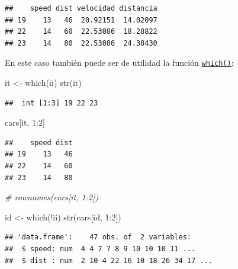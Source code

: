 \documentclass[
]{book}
\newenvironment{Shaded}{\begin{snugshade}}{\end{snugshade}}
\newcommand{\CommentTok}[1]{\textcolor[rgb]{0.56,0.35,0.01}{\textit{#1}}}
\newcommand{\DecValTok}[1]{\textcolor[rgb]{0.00,0.00,0.81}{#1}}
\newcommand{\FunctionTok}[1]{\textcolor[rgb]{0.00,0.00,0.00}{#1}}
\newcommand{\NormalTok}[1]{#1}
\newcommand{\OtherTok}[1]{\textcolor[rgb]{0.56,0.35,0.01}{#1}}
\newcommand{\SpecialCharTok}[1]{\textcolor[rgb]{0.00,0.00,0.00}{#1}}
\theoremstyle{break}
\theoremstyle{nonumberplain}
\begin{document}
\begin{verbatim}
##    speed dist velocidad distancia
## 19    13   46  20.92151  14.02097
## 22    14   60  22.53086  18.28822
## 23    14   80  22.53086  24.38430
\end{verbatim}

En este caso también puede ser de utilidad la función \href{https://www.rdocumentation.org/packages/base/versions/3.6.1/topics/which}{\texttt{which()}}:

\begin{Shaded}
\begin{Highlighting}[]
\NormalTok{it }\OtherTok{\textless{}{-}} \FunctionTok{which}\NormalTok{(ii)}
\FunctionTok{str}\NormalTok{(it)}
\end{Highlighting}
\end{Shaded}

\begin{verbatim}
##  int [1:3] 19 22 23
\end{verbatim}

\begin{Shaded}
\begin{Highlighting}[]
\NormalTok{cars[it, }\DecValTok{1}\SpecialCharTok{:}\DecValTok{2}\NormalTok{]}
\end{Highlighting}
\end{Shaded}

\begin{verbatim}
##    speed dist
## 19    13   46
## 22    14   60
## 23    14   80
\end{verbatim}

\begin{Shaded}
\begin{Highlighting}[]
\CommentTok{\# rownames(cars[it, 1:2])}

\NormalTok{id }\OtherTok{\textless{}{-}} \FunctionTok{which}\NormalTok{(}\SpecialCharTok{!}\NormalTok{ii)}
\FunctionTok{str}\NormalTok{(cars[id, }\DecValTok{1}\SpecialCharTok{:}\DecValTok{2}\NormalTok{])}
\end{Highlighting}
\end{Shaded}

\begin{verbatim}
## 'data.frame':    47 obs. of  2 variables:
##  $ speed: num  4 4 7 7 8 9 10 10 10 11 ...
##  $ dist : num  2 10 4 22 16 10 18 26 34 17 ...
\end{verbatim}

\begin{Shaded}
\end{Shaded}
\end{document}
